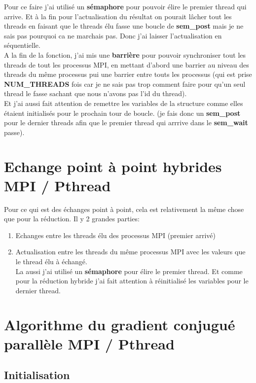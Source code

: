 \documentclass[12pt, letterpaper]{article}
\begin{document}
Pour ce faire j'ai utilisé un \textbf{sémaphore} pour pouvoir élire le premier
thread qui arrive. Et à la fin pour l'actualisation du résultat on pourait
lâcher tout les threads en faisant que le threads élu fasse une boucle de
\textbf{sem\_post} mais je ne sais pas pourquoi ca ne marchais pas. Donc j'ai laisser
l'actualisation en séquentielle.
\\
A la fin de la fonction, j'ai mis une \textbf{barrière} pour pouvoir synchroniser
tout les threads de tout les processus MPI, en mettant d'abord une barrier au
niveau des threads du même processus pui une barrier entre touts les
processus (qui est prise \textbf{NUM\_THREADS} fois car je ne sais pas trop comment
faire pour qu'un seul thread le fasse sachant que nous n'avons pas l'id du
thread).
\\
Et j'ai aussi fait attention de remettre les variables de la structure comme
elles étaient initialisés pour le prochain tour de boucle. (je fais donc un
\textbf{sem\_post} pour le dernier threads afin que le premier thread qui arrrive
dans le \textbf{sem\_wait} passe).

\section{Echange point à point hybrides MPI / Pthread}
\label{sec:org93e5055}

Pour ce qui est des échanges point à point, cela est relativement la même
chose que pour la réduction. Il y 2 grandes parties:
\begin{enumerate}
\item Echanges entre les threads élu des processus MPI (premier arrivé)
\item Actualisation entre les threads du même processus MPI avec les valeurs que
le thread élu à échangé.
\\
La aussi j'ai utilisé un \textbf{sémaphore} pour élire le premier thread. Et comme
pour la réduction hybride j'ai fait attention à réinitialisé les variables
pour le dernier thread.
\end{enumerate}

\section{Algorithme du gradient conjugué parallèle MPI / Pthread}
\label{sec:org7486f6c}
\subsection{Initialisation}
\label{sec:orgfdf8f41}
\end{document}
